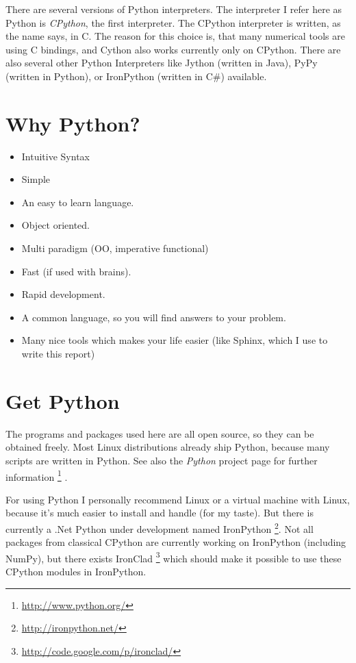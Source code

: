 \documentclass[letterpaper,10pt,english]{manual}
\begin{document}
There are several versions of Python interpreters. The interpreter I
refer here as Python is \emph{CPython}, the first interpreter. The CPython interpreter is written,
as the name says, in C. The reason for this choice is, that many
numerical tools are using C bindings, and Cython also works currently
only on CPython. There are also several other
Python Interpreters like Jython (written in Java), PyPy (written in
Python), or IronPython (written in C\#) available.


\section{Why Python?}
\begin{itemize}
\item {} 
Intuitive Syntax

\item {} 
Simple

\item {} 
An easy to learn language.

\item {} 
Object oriented.

\item {} 
Multi paradigm (OO, imperative functional)

\item {} 
Fast (if used with brains).

\item {} 
Rapid development.

\item {} 
A common language, so you will find answers to your problem.

\item {} 
Many nice tools which makes your life easier (like Sphinx, which I use to write this report)

\end{itemize}


\section{Get Python}

The programs and packages used here are all open source, so they can be obtained freely.
Most Linux distributions already ship Python, because many scripts are written in Python.
See also the \emph{Python} project page for further information \footnote{
\href{http://www.python.org/}{http://www.python.org/}
} .

For using Python I personally recommend Linux or a virtual machine
with Linux, because it's much easier to install and handle (for my taste).
But there is currently a .Net Python under development named
IronPython \footnote{
\href{http://ironpython.net/}{http://ironpython.net/}
}.
Not all packages from classical CPython are currently working on IronPython
(including NumPy), but there exists IronClad \footnote{
\href{http://code.google.com/p/ironclad/}{http://code.google.com/p/ironclad/}
} which should make it
possible to use these CPython modules in IronPython.
\end{document}
